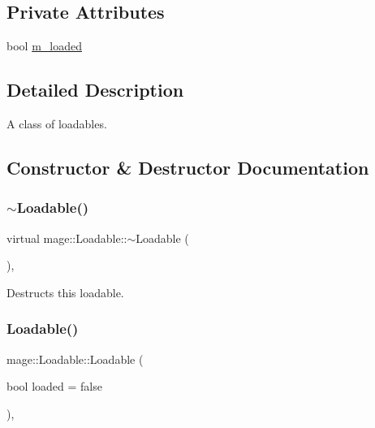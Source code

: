\subsection*{Private Attributes}
\begin{DoxyCompactItemize}
\item 
bool \hyperlink{classmage_1_1_loadable_a993963fbfeb0f2e2ab9616bf7ef6a0f7}{m\+\_\+loaded}
\end{DoxyCompactItemize}


\subsection{Detailed Description}
A class of loadables. 

\subsection{Constructor \& Destructor Documentation}
\hypertarget{classmage_1_1_loadable_a7f51b5e1065ebe4dd1da7ef9c9966546}{}\label{classmage_1_1_loadable_a7f51b5e1065ebe4dd1da7ef9c9966546} 
\subsubsection{\texorpdfstring{$\sim$\+Loadable()}{~Loadable()}}
{\footnotesize\ttfamily virtual mage\+::\+Loadable\+::$\sim$\+Loadable (\begin{DoxyParamCaption}{ }\end{DoxyParamCaption})\hspace{0.3cm}{\ttfamily [virtual]}, {\ttfamily [default]}}

Destructs this loadable. \hypertarget{classmage_1_1_loadable_afbdcb287b5e20583899a27a1c244bc7d}{}\label{classmage_1_1_loadable_afbdcb287b5e20583899a27a1c244bc7d} 
\subsubsection{\texorpdfstring{Loadable()}{Loadable()}\hspace{0.1cm}{\footnotesize\ttfamily [1/3]}}
{\footnotesize\ttfamily mage\+::\+Loadable\+::\+Loadable (\begin{DoxyParamCaption}\item[{bool}]{loaded = {\ttfamily false} }\end{DoxyParamCaption})\hspace{0.3cm}{\ttfamily [explicit]}, {\ttfamily [protected]}}

